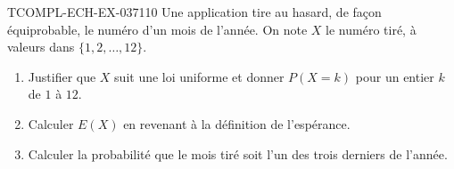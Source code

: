 \begin{exercice}{TCOMPL-ECH-EX-037}{1}{10}
Une application tire au hasard, de façon équiprobable, le numéro d'un mois de l'année. On note $X$ le numéro tiré, à valeurs dans $\{1,2,\ldots,12\}$.
\begin{enumerate}
  \item Justifier que $X$ suit une loi uniforme et donner $P(X=k)$ pour un entier $k$ de $1$ à $12$.
  \item Calculer $E(X)$ en revenant à la définition de l'espérance.
  \item Calculer la probabilité que le mois tiré soit l'un des trois derniers de l'année.
\end{enumerate}
\end{exercice}
